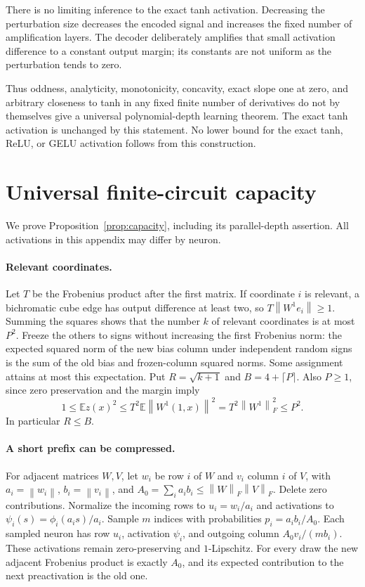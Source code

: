 \documentclass[11pt]{article}
\theoremstyle{remark}\newtheorem{remark}[theorem]{Remark}
\newcommand{\E}{\mathbb E}
\newcommand{\norm}[1]{\left\lVert#1\right\rVert}
\begin{document}
There is no limiting inference to the exact tanh activation.
Decreasing the perturbation size decreases the encoded signal
and increases the fixed number of amplification layers.
The decoder deliberately amplifies that small activation difference
to a constant output margin; its constants are not uniform as the
perturbation tends to zero.

Thus oddness, analyticity, monotonicity, concavity, exact slope
one at zero, and arbitrary closeness to tanh in any fixed
finite number of derivatives do not by themselves give a
universal polynomial-depth learning theorem.
The exact tanh activation is unchanged by this statement.
No lower bound for the exact tanh, ReLU, or GELU activation
follows from this construction.

\appendix
\section{Universal finite-circuit capacity}\label{app:capacity}
We prove Proposition~\ref{prop:capacity}, including its parallel-depth
assertion. All activations in this appendix may differ by neuron.

\paragraph{Relevant coordinates.}
Let $T$ be the Frobenius product after the first matrix. If coordinate
$i$ is relevant, a bichromatic cube edge has output difference at
least two, so $T\norm{W^1e_i}\ge1$. Summing the squares shows that
the number $k$ of relevant coordinates is at most $P^2$.
Freeze the others to signs without increasing the first Frobenius
norm: the expected squared norm of the new bias column under
independent random signs is the sum of the old bias and frozen-column
squared norms. Some assignment attains at most this expectation.
Put $R=\sqrt{k+1}$ and $B=4+\lceil P\rceil$. Also $P\ge1$, since
zero preservation and the margin imply
\[
 1\le\E z(x)^2\le T^2\E\norm{W^1(1,x)}^2
          =T^2\norm{W^1}_F^2\le P^2.
\]
In particular $R\le B$.

\paragraph{A short prefix can be compressed.}
For adjacent matrices $W,V$, let $w_i$ be row $i$ of $W$ and
$v_i$ column $i$ of $V$, with $a_i=\norm{w_i}$, $b_i=\norm{v_i}$,
and $A_0=\sum_i a_ib_i\le\norm W_F\norm V_F$.
Delete zero contributions. Normalize the incoming rows to
$u_i=w_i/a_i$ and activations to
$\psi_i(s)=\phi_i(a_i s)/a_i$.
Sample $m$ indices with probabilities $p_i=a_ib_i/A_0$.
Each sampled neuron has row $u_i$, activation $\psi_i$, and
outgoing column $A_0v_i/(mb_i)$. These activations remain
zero-preserving and $1$-Lipschitz. For every draw the new adjacent
Frobenius product is exactly $A_0$, and its expected contribution
to the next preactivation is the old one.
\end{document}
